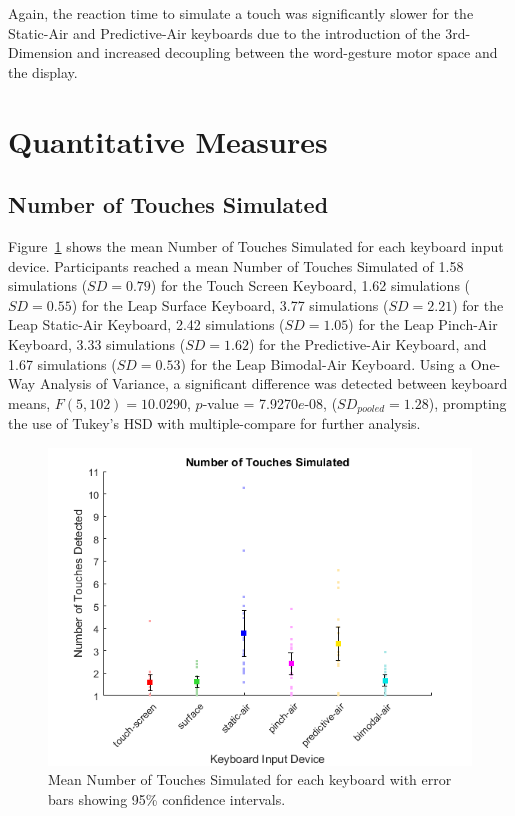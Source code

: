 Again, the reaction time to simulate a touch was significantly slower for the Static-Air and Predictive-Air keyboards due to the introduction of the 3rd-Dimension and increased decoupling between the word-gesture motor space and the display.

\section{Quantitative Measures}

\subsection{Number of Touches Simulated}
Figure~\ref{fig_num_touches_mean} shows the mean Number of Touches Simulated for each keyboard input device. Participants reached a mean Number of Touches Simulated of 1.58 simulations ($SD = 0.79$) for the Touch Screen Keyboard, 1.62 simulations ($SD = 0.55$) for the Leap Surface Keyboard, 3.77 simulations ($SD = 2.21$) for the Leap Static-Air Keyboard, 2.42 simulations ($SD = 1.05$) for the Leap Pinch-Air Keyboard, 3.33 simulations ($SD = 1.62$) for the Predictive-Air Keyboard, and 1.67 simulations ($SD = 0.53$) for the Leap Bimodal-Air Keyboard. Using a One-Way Analysis of Variance, a significant difference was detected between keyboard means, $F(5, 102) = 10.0290$, $p$-value = 7.9270$e$-08, ($SD_{pooled} = 1.28$), prompting the use of Tukey's HSD with multiple-compare for further analysis.

\begin{figure}[h]
	\centering
	\includegraphics{fig_num_touches_mean}
	\caption[Mean Number of Touches Simulated]{Mean Number of Touches Simulated for each keyboard with error bars showing 95\% confidence intervals.}
	\label{fig_num_touches_mean}
\end{figure}


